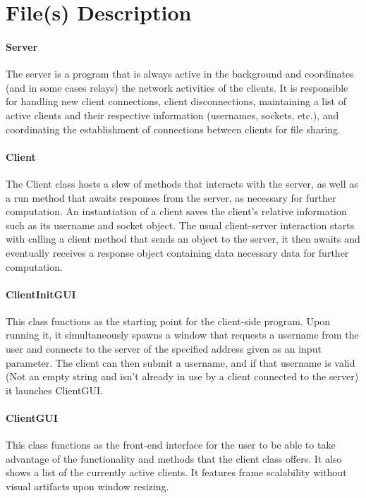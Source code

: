 \documentclass[12pt, a4paper]{article}
\begin{document}
\section{File(s) Description}
\paragraph{Server}
The server is a program that is always active in the background and coordinates (and in some cases relays) the network activities of the clients. It is responsible for handling new client connections, client disconnections, maintaining a list of active clients and their respective information (usernames, sockets, etc.), and coordinating the establishment of connections between clients for file sharing.

\paragraph{Client}
The Client class hosts a slew of methods that interacts with the server, as well as a run method that awaits responses from the server, as necessary for further computation. An instantiation of a client saves the client's relative information such as its username and socket object. The usual client-server interaction starts with calling a client method that sends an object to the server, it then awaits and eventually receives a response object containing data necessary data for further computation.

\paragraph{ClientInitGUI}
This class functions as the starting point for the client-side program. Upon running it, it simultaneously spawns a window that requests a username from the user and connects to the server of the specified address given as an input parameter. The client can then submit a username, and if that username is valid (Not an empty string and isn't already in use by a client connected to the server) it launches ClientGUI.

\paragraph{ClientGUI}
This class functions as the front-end interface for the user to be able to take advantage of the functionality and methods that the client class offers. It also shows a list of the currently active clients. It features frame scalability without visual artifacts upon window resizing.
\end{document}
